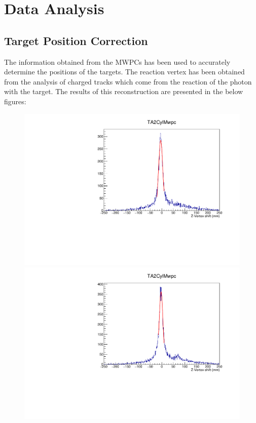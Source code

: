 \chapter{Data Analysis}

\section{Target Position Correction}

\indent The information obtained from the MWPCs has been used to accurately determine the positions of the targets. The reaction vertex has been obtained from the analysis of charged tracks which come from the reaction of the photon with the target. The results of this reconstruction are presented in the below figures:

\begin{figure}[H]
\begin{center}
\includegraphics[scale=0.55]{pictures/pdf/VertexZ_sn116.pdf}
\includegraphics[scale=0.55]{pictures/pdf/VertexZ_sn120.pdf}

\end{center}
\end{figure}
